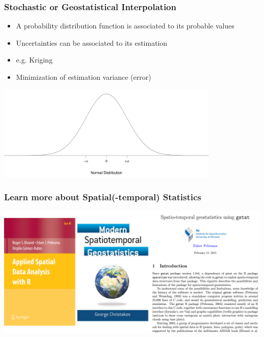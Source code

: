 \documentclass{beamer}
\begin{document}

\begin{frame}
\frametitle{Stochastic or Geostatistical Interpolation}
\begin{itemize}
\item A probability distribution function is associated to its probable values
\item Uncertainties can be associated to its estimation
\item \alert{e.g. Kriging}
\item \alert{Minimization of estimation variance (error)}
\end{itemize}
\includegraphics[width=0.8\textwidth]{Figures/normald.png}
\end{frame}


\begin{frame}
\frametitle{Learn more about Spatial(-temporal) Statistics}
\centering
\includegraphics[width=\textwidth]{Figures/books.png}
\end{frame}

\end{document}
